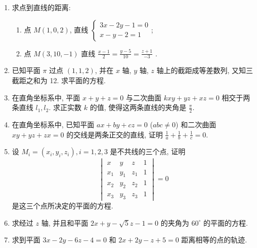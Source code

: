 \begin{enumerate}
    \item 求点到直线的距离:
    \begin{enumerate}
        \item 点 $M(1,0,2)$, 直线
        $\begin{cases}
            3x-2y-1=0 \\
            x-y-2=1 
        \end{cases}$;
        \item 点 $M(3,10,-1)$ 直线 $\frac{x-1}{2}=\frac{y-5}{10}=\frac{z+1}{-3}$ .
    \end{enumerate}
    \item 已知平面 $\pi$ 过点 $(1,1,2)$, 并在 $ x $ 轴, $ y $ 轴, $ z $ 轴上的截距成等差数列, 又知三截距之和为 12. 求平面的方程.

    \item 在直角坐标系中, 平面 $x+y+z=0$ 与二次曲面 $kxy+yz+xz = 0$ 相交于两条直线 $l_1, l_2$. 求正实数 $k$ 的值, 使得这两条直线的夹角是 $\frac{\pi}{2}$.

    \item 在直角坐标系中, 已知平面 $ax + by + cz = 0$ ($abc \neq 0$) 和二次曲面 $xy+yz+zx=0$ 的交线是两条正交的直线, 证明 $\frac{1}{a}+\frac{1}{b}+\frac{1}{c}=0$.

    \item 设 $M_{i}=(x_{i},y_{i},z_{i}), i=1,2,3$ 是不共线的三个点, 证明
    \[
    \begin{vmatrix}
        x & y & z & 1 \\
        x_1 & y_1 & z_1 & 1 \\
        x_2 & y_2 & z_2 & 1 \\
        x_3 & y_3 & z_3 & 1
    \end{vmatrix}
    =0
    \]
    是这三个点所决定的平面的方程.

    \item 求经过 $ z $ 轴, 并且和平面 $2x+y-\sqrt{5}z-1=0$ 的夹角为 $60^\circ$ 的平面的方程.

    \item 求到平面 $3x-2y-6z-4=0$ 和 $2x+2y-z+5=0$ 距离相等的点的轨迹.
\end{enumerate}

